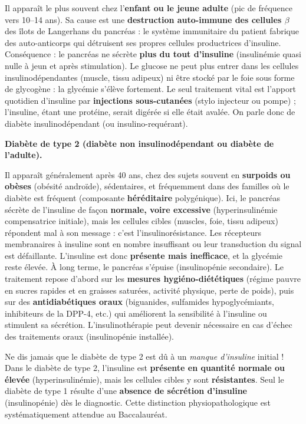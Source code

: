 \documentclass[11pt]{article}
\newcommand{\cle}[1]{{\popxbold\color{popdark}#1}}
\begin{document}
Il apparaît le plus souvent chez l'\textbf{enfant ou le jeune adulte} (pic de fréquence vers 10--14 ans). Sa cause est une \textbf{destruction auto-immune des cellules $\beta$} des îlots de Langerhans du pancréas : le système immunitaire du patient fabrique des auto-anticorps qui détruisent ses propres cellules productrices d'insuline. Conséquence : le pancréas ne sécrète \textbf{plus du tout d'insuline} (\cle{insulinémie} quasi nulle à jeun et après stimulation). Le glucose ne peut plus entrer dans les cellules insulinodépendantes (muscle, tissu adipeux) ni être stocké par le foie sous forme de glycogène : la glycémie s'élève fortement. Le seul traitement vital est l'apport quotidien d'insuline par \textbf{injections sous-cutanées} (stylo injecteur ou pompe) ; l'insuline, étant une protéine, serait digérée si elle était avalée. On parle donc de diabète \cle{insulinodépendant} (ou \cle{insulino-requérant}).

\textbf{Diabète de type 2 (diabète non insulinodépendant ou diabète de l'adulte).}

Il apparaît généralement après 40 ans, chez des sujets souvent en \textbf{surpoids ou obèses} (obésité androïde), sédentaires, et fréquemment dans des familles où le diabète est fréquent (composante \textbf{héréditaire} polygénique). Ici, le pancréas sécrète de l'insuline de façon \textbf{normale, voire excessive} (hyperinsulinémie compensatrice initiale), mais les cellules cibles (muscles, foie, tissu adipeux) répondent mal à son message : c'est l'\cle{insulinorésistance}. Les récepteurs membranaires à insuline sont en nombre insuffisant ou leur transduction du signal est défaillante. L'insuline est donc \textbf{présente mais inefficace}, et la glycémie reste élevée. À long terme, le pancréas s'épuise (insulinopénie secondaire). Le traitement repose d'abord sur les \textbf{mesures hygiéno-diététiques} (régime pauvre en sucres rapides et en graisses saturées, activité physique, perte de poids), puis sur des \textbf{antidiabétiques oraux} (biguanides, sulfamides hypoglycémiants, inhibiteurs de la DPP-4, etc.) qui améliorent la sensibilité à l'insuline ou stimulent sa sécrétion. L'insulinothérapie peut devenir nécessaire en cas d'échec des traitements oraux (insulinopénie installée).

\begin{attention}
Ne dis jamais que le diabète de type 2 est dû à un \emph{manque d'insuline} initial ! Dans le diabète de type 2, l'insuline est \textbf{présente en quantité normale ou élevée} (hyperinsulinémie), mais les cellules cibles y sont \textbf{résistantes}. Seul le diabète de type 1 résulte d'une \textbf{absence de sécrétion d'insuline} (insulinopénie) dès le diagnostic. Cette distinction physiopathologique est systématiquement attendue au Baccalauréat.
\end{attention}
\end{document}
